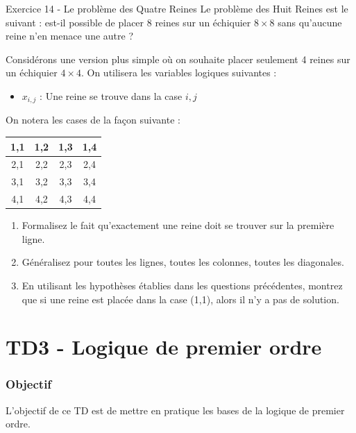 \documentclass[a4paper,11pt]{article}
\begin{document}
\begin{exercisebox}{Exercice 14 - Le problème des Quatre Reines}
Le problème des Huit Reines est le suivant : est-il possible de placer 8 reines sur un échiquier $8 \times 8$ sans qu'aucune reine n'en menace une autre ?

Considérons une version plus simple où on souhaite placer seulement 4 reines sur un échiquier $4 \times 4$. On utilisera les variables logiques suivantes :
\begin{itemize}
    \item $x_{i,j}$ : Une reine se trouve dans la case $i, j$
\end{itemize}

On notera les cases de la façon suivante :
\begin{center}
\begin{tabular}{|c|c|c|c|}
\hline
1,1 & 1,2 & 1,3 & 1,4 \\
\hline
2,1 & 2,2 & 2,3 & 2,4 \\
\hline
3,1 & 3,2 & 3,3 & 3,4 \\
\hline
4,1 & 4,2 & 4,3 & 4,4 \\
\hline
\end{tabular}
\end{center}

\begin{enumerate}
    \item Formalisez le fait qu'exactement une reine doit se trouver sur la première ligne.
    \item Généralisez pour toutes les lignes, toutes les colonnes, toutes les diagonales.
    \item En utilisant les hypothèses établies dans les questions précédentes, montrez que si une reine est placée dans la case (1,1), alors il n'y a pas de solution.
\end{enumerate}
\end{exercisebox}

\newpage


\part{TD3 - Logique de premier ordre}

\section*{Objectif}
L'objectif de ce TD est de mettre en pratique les bases de la logique de premier ordre.
\end{document}
